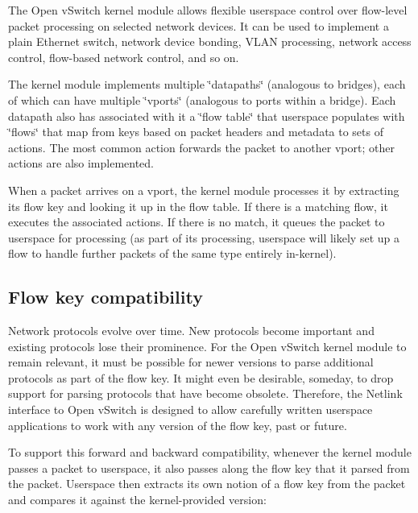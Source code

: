 The Open v\+Switch kernel module allows flexible userspace control over flow-\/level packet processing on selected network devices. It can be used to implement a plain Ethernet switch, network device bonding, V\+L\+A\+N processing, network access control, flow-\/based network control, and so on.

The kernel module implements multiple \char`\"{}datapaths\char`\"{} (analogous to bridges), each of which can have multiple \char`\"{}vports\char`\"{} (analogous to ports within a bridge). Each datapath also has associated with it a \char`\"{}flow
table\char`\"{} that userspace populates with \char`\"{}flows\char`\"{} that map from keys based on packet headers and metadata to sets of actions. The most common action forwards the packet to another vport; other actions are also implemented.

When a packet arrives on a vport, the kernel module processes it by extracting its flow key and looking it up in the flow table. If there is a matching flow, it executes the associated actions. If there is no match, it queues the packet to userspace for processing (as part of its processing, userspace will likely set up a flow to handle further packets of the same type entirely in-\/kernel).

\subsection*{Flow key compatibility }

Network protocols evolve over time. New protocols become important and existing protocols lose their prominence. For the Open v\+Switch kernel module to remain relevant, it must be possible for newer versions to parse additional protocols as part of the flow key. It might even be desirable, someday, to drop support for parsing protocols that have become obsolete. Therefore, the Netlink interface to Open v\+Switch is designed to allow carefully written userspace applications to work with any version of the flow key, past or future.

To support this forward and backward compatibility, whenever the kernel module passes a packet to userspace, it also passes along the flow key that it parsed from the packet. Userspace then extracts its own notion of a flow key from the packet and compares it against the kernel-\/provided version\+:


